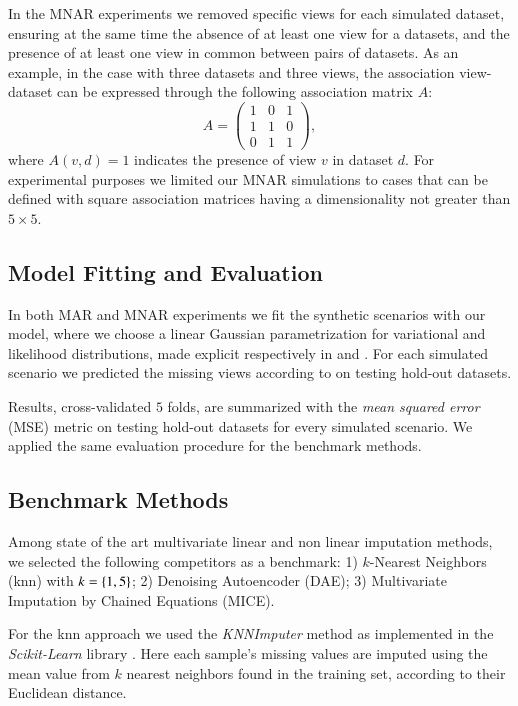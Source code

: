 In the MNAR experiments we removed specific views for each simulated dataset, ensuring at the same time the absence of at least one view for a datasets, and the presence of at least one view in common between pairs of datasets.
As an example, in the case with three datasets and three views, the association view-dataset can be expressed through the following association matrix $A$:
\begin{equation}
A = 
\begin{pmatrix}
1 & 0 & 1 \\
1 & 1 & 0 \\
0 & 1 & 1 
\end{pmatrix},
\end{equation}
where $A(v,d)=1$ indicates the presence of view $v$ in dataset $d$.
For experimental purposes we limited our MNAR simulations to cases that can be defined with square association matrices having a dimensionality not greater than $5\times5$.

\subsection{Model Fitting and Evaluation}
In both MAR and MNAR experiments we fit the synthetic scenarios with our model, where we choose a linear Gaussian parametrization for variational and likelihood distributions, made explicit respectively in  and .
For each simulated scenario we predicted the missing views according to  on testing hold-out datasets.

Results, cross-validated $5$ folds, are summarized with the \textit{mean squared error} (MSE) metric on testing hold-out datasets for every simulated scenario.
We applied the same evaluation procedure for the benchmark methods.

\subsection{Benchmark Methods}
Among state of the art multivariate linear and non linear imputation methods, we selected the following competitors as a benchmark:
1) $k$-Nearest Neighbors (knn) with $k=\left\{1, 5\right\}$;
2) Denoising Autoencoder (DAE);
3) Multivariate Imputation by Chained Equations (MICE).

For the knn approach we used the \textit{KNNImputer} method as implemented in the \textit{Scikit-Learn} library \citep{sklearn}.
Here each sample's missing values are imputed using the mean value from $k$ nearest neighbors found in the training set, according to their Euclidean distance.

